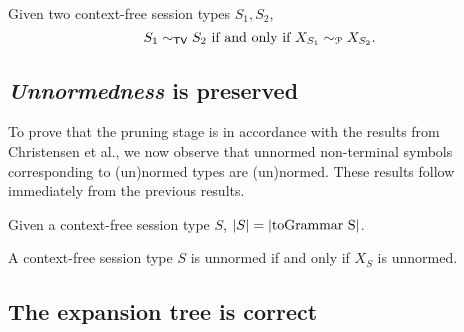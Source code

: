 \begin{theorem}
\label{cfst_vs_grammar}
	Given two context-free session types $S_1, S_2$,
	\[ S_1 \sim_{\mathsf{TV}} S_2 \text{ if and only if } X_{S_1} \sim_{\mathcal{P}} X_{S_2}. \]
\end{theorem}

\subsection{\textit{Unnormedness} is preserved}

To prove that the pruning stage is in accordance with the results
from Christensen et al., we now observe that unnormed non-terminal symbols
corresponding to (un)normed types are (un)normed. These results follow
immediately from the previous results.

\begin{corollary}
	Given a context-free session type $S$, $|S| = |\text{\lstinline{toGrammar S}}|$.
\end{corollary}

\begin{corollary}
	A context-free session type $S$ is unnormed if and only if
	$X_S$ is unnormed.
\end{corollary}

\subsection{The expansion tree is correct}
%
%
%

